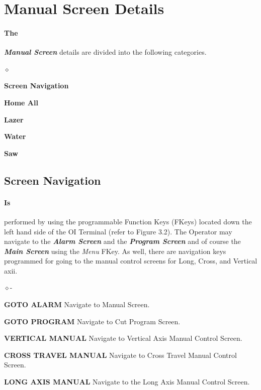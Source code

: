 \section{Manual Screen Details}
\paragraph*{The}\textbf{\textit{Manual Screen}} details are divided into the following categories.
\begin{list}{$\diamond$}{}
	\item \textbf{Screen Navigation}
	\item \textbf{Home All}
	\item \textbf{Lazer}
	\item \textbf{Water}
	\item \textbf{Saw}
\end{list}
\subsection{Screen Navigation}\paragraph*{Is}performed by using the programmable Function Keys (FKeys) located down the left hand side of the OI Terminal (refer to Figure 3.2). The Operator may navigate to the \textbf{\textit{Alarm Screen}} and the \textbf{\textit{Program Screen}} and of course the \textbf{\textit{Main Screen}} using the \textit{Menu} FKey. As well, there are navigation keys programmed for going to the manual control screens for Long, Cross, and Vertical axii.
\begin{list}{$\diamond$-}{}
	\item \textbf{GOTO ALARM} Navigate to Manual Screen.
	\item \textbf{GOTO PROGRAM} Navigate to Cut Program Screen.
	\item \textbf{VERTICAL MANUAL} Navigate to Vertical Axis Manual Control Screen.
	\item \textbf{CROSS TRAVEL MANUAL} Navigate to Cross Travel Manual Control Screen.
	\item \textbf{LONG AXIS MANUAL} Navigate to the Long Axis Manual Control Screen.
\end{list}
